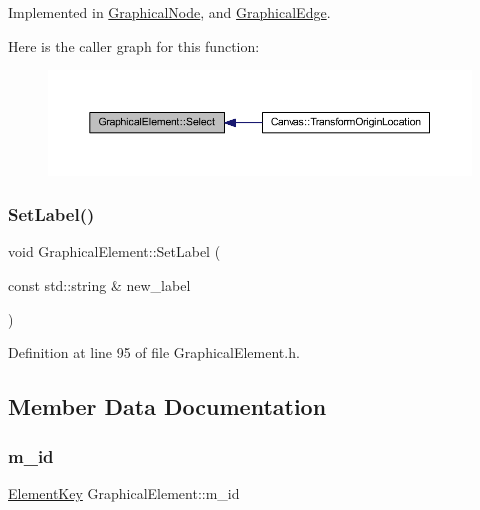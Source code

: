 Implemented in \hyperlink{class_graphical_node_ac73e20f3d4c5cca556e0140ef558f6a4}{Graphical\+Node}, and \hyperlink{class_graphical_edge_aa2dbc33d5177ce3aad84f39ba97921de}{Graphical\+Edge}.

Here is the caller graph for this function\+:
\nopagebreak
\begin{figure}[H]
\begin{center}
\leavevmode
\includegraphics[width=350pt]{class_graphical_element_a2627b34e57829f942aa00720d9cc8b46_icgraph}
\end{center}
\end{figure}
\mbox{\label{class_graphical_element_a43627056bafcd65a43eb424dff889e99}} 
\subsubsection{\texorpdfstring{Set\+Label()}{SetLabel()}}
{\footnotesize\ttfamily void Graphical\+Element\+::\+Set\+Label (\begin{DoxyParamCaption}\item[{const std\+::string \&}]{new\+\_\+label }\end{DoxyParamCaption})\hspace{0.3cm}{\ttfamily [inline]}}



Definition at line 95 of file Graphical\+Element.\+h.



\subsection{Member Data Documentation}
\mbox{\label{class_graphical_element_a03d7e29a10d456a4944ce06c6964d15a}} 
\subsubsection{\texorpdfstring{m\+\_\+id}{m\_id}}
{\footnotesize\ttfamily \hyperlink{_graphical_element_8h_ade5fd6c85839a416577ff9de1605141e}{Element\+Key} Graphical\+Element\+::m\+\_\+id\hspace{0.3cm}{\ttfamily [protected]}}



